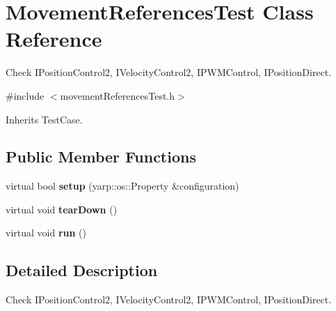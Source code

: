 \section{Movement\+References\+Test Class Reference}
\label{classMovementReferencesTest}


Check I\+Position\+Control2, I\+Velocity\+Control2, I\+P\+W\+M\+Control, I\+Position\+Direct.  




{\ttfamily \#include $<$movement\+References\+Test.\+h$>$}



Inherits Test\+Case.

\subsection*{Public Member Functions}
\begin{DoxyCompactItemize}
\item 
\mbox{\label{classMovementReferencesTest_ad9cc73f5b5865dec9d185bf4063e53a8}} 
virtual bool {\bfseries setup} (yarp\+::os\+::\+Property \&configuration)
\item 
\mbox{\label{classMovementReferencesTest_a593c8be2be3fe9bf79c7d0d7c5d817b9}} 
virtual void {\bfseries tear\+Down} ()
\item 
\mbox{\label{classMovementReferencesTest_afd727ad62714859a969e5b3c47959eca}} 
virtual void {\bfseries run} ()
\end{DoxyCompactItemize}


\subsection{Detailed Description}
Check I\+Position\+Control2, I\+Velocity\+Control2, I\+P\+W\+M\+Control, I\+Position\+Direct. 

